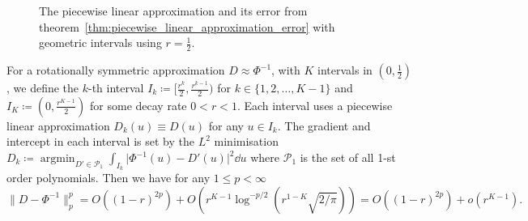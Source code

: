 \documentclass[manuscript,review]{acmart}
\DeclareMathOperator*{\argmin}{argmin} %
\begin{document}
\begin{figure}[htb]
\centering

\hfill
{} \hfill 
{}\hfill

\caption{The piecewise linear approximation and its error from theorem~\ref{thm:piecewise_linear_approximation_error} with geometric intervals using $ r = \tfrac{1}{2} $.}
\label{fig:piecewise_linear_approximation}
\end{figure}

\begin{theorem}
\label{thm:piecewise_linear_approximation_error}
For a rotationally symmetric approximation $ D \approx \Phi^{-1}$, with $ K $ intervals in $ (0, \tfrac{1}{2}) $, we define the $ k $-th interval $ I_k \coloneqq [\tfrac{r^k}{2}, \tfrac{r^{k-1}}{2})$ for $ k \in \{1,2,\ldots, K-1\} $ and $ I_K \coloneqq (0, \tfrac{r^{K-1}}{2}) $ for some decay rate $ 0 < r < 1 $. Each interval uses a piecewise linear approximation $ D_k(u) \equiv D(u) $ for any $ u \in I_k $. The gradient and intercept in each interval is set by the $ L^2 $ minimisation $ D_k \coloneqq \argmin_{D' \in \mathcal{P}_1} \int_{I_k}\lvert\Phi^{-1}(u) - D'(u)\rvert^2 \dd{u} $ where $ \mathcal{P}_1 $  is the set of all 1-st order polynomials. Then we have for any $ 1 \leq p < \infty  $
\begin{equation*}
\lVert D - \Phi^{-1}\rVert_p^p 
= O((1-r)^{2p}) +
O(r^{K-1} {\log}^{-p/2}(r^{1-K}\sqrt{2/\pi}))  = O((1-r)^{2p}) +
o(r^{K-1}).
\end{equation*}
\end{theorem}
\end{document}
